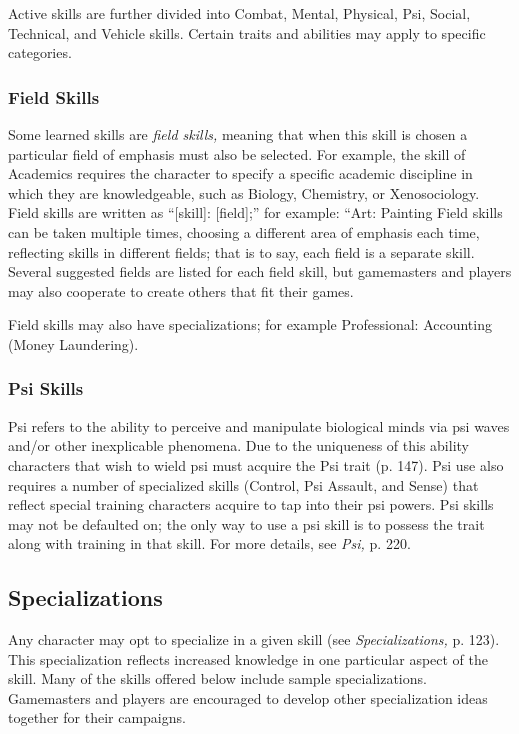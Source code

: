 Active skills are further divided into Combat, 
Mental, Physical, Psi, Social, Technical, and Vehicle 
skills. Certain traits and abilities may apply to specific 
categories.

\subsubsection{Field Skills}

Some learned skills are \textit{field skills,} meaning that when 
this skill is chosen a particular field of emphasis must 
also be selected. For example, the skill of Academics 
requires the character to specify a specific academic 
discipline in which they are knowledgeable, such as 
Biology, Chemistry, or Xenosociology. Field skills are 
written as ``[skill]: [field];'' for example: ``Art: Painting
Field skills can be taken multiple times, choosing
a different area of emphasis each time, reflecting skills 
in different fields; that is to say, each field is a separate 
skill. Several suggested fields are listed for each field 
skill, but gamemasters and players may also cooperate 
to create others that fit their games.

Field skills may also have specializations; for example
Professional: Accounting (Money Laundering).

\subsubsection{Psi Skills}

Psi refers to the ability to perceive and manipulate 
biological minds via psi waves and/or other inexplicable
phenomena. Due to the uniqueness of this ability
characters that wish to wield psi must acquire the
Psi trait (p. 147). Psi use also requires a number of 
specialized skills (Control, Psi Assault, and Sense) that 
reflect special training characters acquire to tap into 
their psi powers. Psi skills may not be defaulted on; 
the only way to use a psi skill is to possess the trait 
along with training in that skill. For more details, see 
\textit{Psi,} p. 220.

\subsection{Specializations}

Any character may opt to specialize in a given skill 
(see \textit{Specializations,} p. 123). This specialization reflects 
increased knowledge in one particular aspect of the 
skill. Many of the skills offered below include sample 
specializations. Gamemasters and players are encouraged
to develop other specialization ideas together for
their campaigns.

